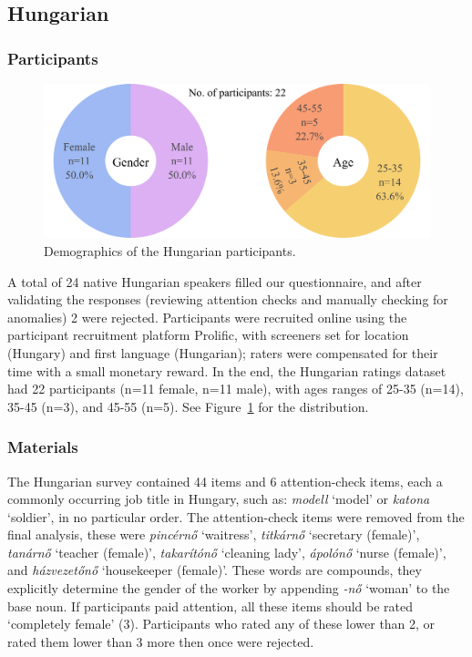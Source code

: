 \documentclass[11pt]{article}
\begin{document}
\subsection{Hungarian}

\subsubsection{Participants}

\begin{figure}[!ht]
  \centering
  \includegraphics[width=\linewidth]{../demographics_hu}
  \caption{Demographics of the Hungarian participants.}
  \label{fig:demographics_hu}
\end{figure}

A total of 24 native Hungarian speakers filled our questionnaire, and after validating the responses (reviewing attention checks and manually checking for anomalies) 2 were rejected. Participants were recruited online using the participant recruitment platform Prolific, with screeners set for location (Hungary) and first language (Hungarian); raters were compensated for their time with a small monetary reward. In the end, the Hungarian ratings dataset had 22 participants (n=11 female, n=11 male), with ages ranges of 25-35 (n=14), 35-45 (n=3), and 45-55 (n=5). See Figure~\ref{fig:demographics_hu} for the distribution.

\subsubsection{Materials}

The Hungarian survey contained 44 items and 6 attention-check items, each a commonly occurring job title in Hungary, such as: \textit{modell} `model' or \textit{katona} `soldier', in no particular order. The attention-check items were removed from the final analysis, these were \textit{pincérnő} `waitress', \textit{titkárnő} `secretary (female)', \textit{tanárnő} `teacher (female)', \textit{takarítónő} `cleaning lady', \textit{ápolónő} `nurse (female)', and \textit{házvezetőnő} `housekeeper (female)'. These words are compounds, they explicitly determine the gender of the worker by appending \textit{-nő} `woman' to the base noun. If participants paid attention, all these items should be rated `completely female' (3). Participants who rated any of these lower than 2, or rated them lower than 3 more then once were rejected.
\end{document}

